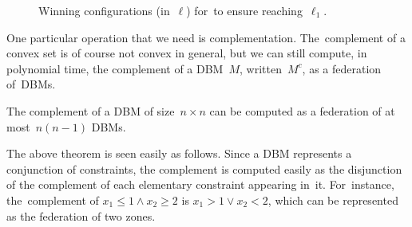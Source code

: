 \begin{figure}[ht]
\begin{tikzpicture}[node distance=2.5cm,auto]
  \end{tikzpicture}
  \caption{Winning configurations (in~$\ell$)
    for~\Eve to ensure reaching~$\ell_1$.
  }
  \label{10-fig:non-convex}
\end{figure}

One particular operation that we need is complementation.
The~complement of a convex set is of course not convex in general, but
we can still compute, in polynomial time, the complement of a DBM~$M$,
written~$M^c$, as a federation of~DBMs.
\begin{theorem}
  The complement of a DBM of size~$n\times n$ can be computed as a
  federation of at most~$n(n-1)$ DBMs.
\end{theorem}
The above theorem is seen easily as follows. Since a DBM represents a
conjunction of constraints, the complement is computed easily as the
disjunction of the complement of each elementary constraint appearing
in~it.  For~instance, the~complement of $x_1\leq 1 \land x_2 \geq 2$ is
$x_1>1 \lor x_2<2$, which can be represented as the federation of two
zones.




